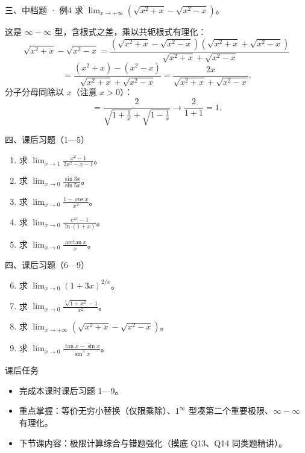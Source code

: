 \documentclass[aspectratio=169,11pt]{beamer}
\begin{document}
\begin{frame}{三、中档题 · 例4}
 求 $\displaystyle\lim_{x\to+\infty}\left(\sqrt{x^2+x}-\sqrt{x^2-x}\right)$。

 这是 $\infty-\infty$ 型，含根式之差，乘以共轭根式有理化：
\[
\sqrt{x^2+x}-\sqrt{x^2-x}
=\frac{(\sqrt{x^2+x}-\sqrt{x^2-x})(\sqrt{x^2+x}+\sqrt{x^2-x})}{\sqrt{x^2+x}+\sqrt{x^2-x}}
\]
\[
=\frac{(x^2+x)-(x^2-x)}{\sqrt{x^2+x}+\sqrt{x^2-x}}
=\frac{2x}{\sqrt{x^2+x}+\sqrt{x^2-x}}.
\]
分子分母同除以 $x$（注意 $x>0$）：
\[
=\frac{2}{\sqrt{1+\frac1x}+\sqrt{1-\frac1x}}
\to \frac{2}{1+1}=1.
\]

\end{frame}

\begin{frame}{四、课后习题（1—5）}
\begin{enumerate}
  \item 求 $\displaystyle\lim_{x\to 1}\frac{x^2-1}{2x^2-x-1}$。
  \item 求 $\displaystyle\lim_{x\to 0}\frac{\sin 3x}{\sin 5x}$。
  \item 求 $\displaystyle\lim_{x\to 0}\frac{1-\cos x}{x^2}$。
  \item 求 $\displaystyle\lim_{x\to 0}\frac{e^{2x}-1}{\ln(1+x)}$。
  \item 求 $\displaystyle\lim_{x\to 0}\frac{\arctan x}{x}$。
\end{enumerate}
\end{frame}

\begin{frame}{四、课后习题（6—9）}
\begin{enumerate}\setcounter{enumi}{5}
  \item 求 $\displaystyle\lim_{x\to 0}(1+3x)^{2/x}$。
  \item 求 $\displaystyle\lim_{x\to 0}\frac{\sqrt[3]{1+x^2}-1}{x^2}$。
  \item 求 $\displaystyle\lim_{x\to+\infty}\left(\sqrt{x^2+x}-\sqrt{x^2-x}\right)$。
  \item 求 $\displaystyle\lim_{x\to 0}\frac{\tan x-\sin x}{\sin^3 x}$。
\end{enumerate}
\end{frame}

\begin{frame}{课后任务}
\begin{itemize}
  \item 完成本课时课后习题 1—9。
  \item 重点掌握：等价无穷小替换（仅限乘除）、$1^\infty$ 型凑第二个重要极限、$\infty-\infty$ 有理化。
  \item 下节课内容：极限计算综合与错题强化（摸底 Q13、Q14 同类题精讲）。
\end{itemize}
\end{frame}
\end{document}
